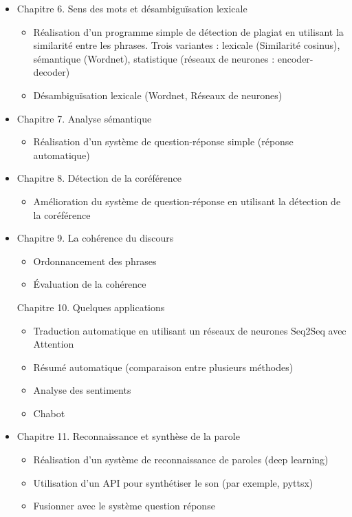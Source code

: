 \documentclass[11pt, a4paper]{article}
\begin{document}
\begin{itemize}
	\item Chapitre 6. Sens des mots et désambiguïsation lexicale
	\begin{itemize}
		\item Réalisation d'un programme simple de détection de plagiat en utilisant la similarité entre les phrases. Trois variantes : lexicale (Similarité cosinus), sémantique (Wordnet), statistique (réseaux de neurones : encoder-decoder)
		\item Désambiguïsation lexicale (Wordnet, Réseaux de neurones)
	\end{itemize}

	\item Chapitre 7. Analyse sémantique
	\begin{itemize}
		\item Réalisation d'un système de question-réponse simple (réponse automatique)
	\end{itemize}

	\item Chapitre 8. Détection de la coréférence
	\begin{itemize}
		\item Amélioration du système de question-réponse en utilisant la détection de la coréférence
	\end{itemize}

	\item Chapitre 9. La cohérence du discours
	\begin{itemize}
		\item Ordonnancement des phrases
		\item Évaluation de la cohérence
	\end{itemize}

	Chapitre 10. Quelques applications
	\begin{itemize}
		\item Traduction automatique en utilisant un réseaux de neurones Seq2Seq avec Attention
		\item Résumé automatique (comparaison entre plusieurs méthodes)
		\item Analyse des sentiments 
		\item Chabot 
	\end{itemize}
	\item Chapitre 11. Reconnaissance et synthèse de la parole
	\begin{itemize}
		\item Réalisation d'un système de reconnaissance de paroles (deep learning)
		\item Utilisation d'un API pour synthétiser le son (par exemple, pyttsx)
		\item Fusionner avec le système question réponse
	\end{itemize}

\end{itemize}
\end{document}
